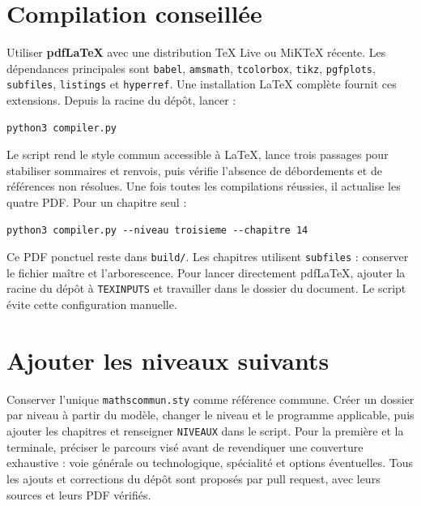 \documentclass[11pt,a4paper,oneside]{book}
\begin{document}
\section{Compilation conseillée}
Utiliser \textbf{pdfLaTeX} avec une distribution TeX Live ou MiKTeX récente. Les dépendances principales sont \texttt{babel}, \texttt{amsmath}, \texttt{tcolorbox}, \texttt{tikz}, \texttt{pgfplots}, \texttt{subfiles}, \texttt{listings} et \texttt{hyperref}. Une installation LaTeX complète fournit ces extensions.
Depuis la racine du dépôt, lancer :
\begin{lstlisting}
python3 compiler.py
\end{lstlisting}
Le script rend le style commun accessible à LaTeX, lance trois passages pour stabiliser sommaires et renvois, puis vérifie l'absence de débordements et de références non résolues. Une fois toutes les compilations réussies, il actualise les quatre PDF. Pour un chapitre seul :
\begin{lstlisting}
python3 compiler.py --niveau troisieme --chapitre 14
\end{lstlisting}
Ce PDF ponctuel reste dans \texttt{build/}. Les chapitres utilisent \texttt{subfiles} : conserver le fichier maître et l'arborescence. Pour lancer directement pdfLaTeX, ajouter la racine du dépôt à \texttt{TEXINPUTS} et travailler dans le dossier du document. Le script évite cette configuration manuelle.
\section{Ajouter les niveaux suivants}
Conserver l'unique \texttt{mathscommun.sty} comme référence commune. Créer un dossier par niveau à partir du modèle, changer le niveau et le programme applicable, puis ajouter les chapitres et renseigner \texttt{NIVEAUX} dans le script. Pour la première et la terminale, préciser le parcours visé avant de revendiquer une couverture exhaustive : voie générale ou technologique, spécialité et options éventuelles. Tous les ajouts et corrections du dépôt sont proposés par pull request, avec leurs sources et leurs PDF vérifiés.
\end{document}
